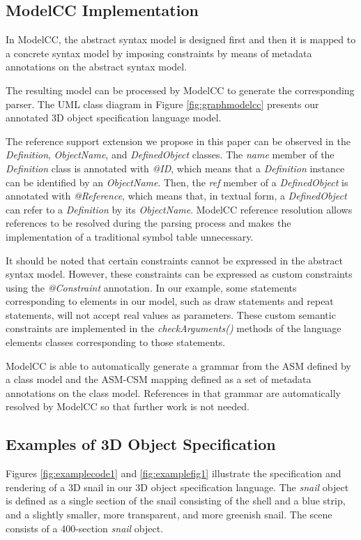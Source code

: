 \documentclass[floatfix,rmp,twocolumn,twoside]{revtex4}
\begin{document}
\subsection{ModelCC Implementation}

In ModelCC, the abstract syntax model is designed first and then it is mapped to a concrete syntax model by imposing constraints by means of metadata annotations on the abstract syntax model.

The resulting model can be processed by ModelCC to generate the corresponding parser.
The UML class diagram in Figure \ref{fig:graphmodelcc} presents our annotated 3D object specification language model.

The reference support extension we propose in this paper can be observed in the \emph{Definition}, \emph{ObjectName}, and \emph{DefinedObject} classes. The \emph{name} member of the \emph{Definition} class is annotated with \emph{@ID}, which means that a \emph{Definition} instance can be identified by an \emph{ObjectName}. Then, the \emph{ref} member of a \emph{DefinedObject} is annotated with \emph{@Reference}, which means that, in textual form, a \emph{DefinedObject} can refer to a \emph{Definition} by its \emph{ObjectName}. ModelCC reference resolution allows references to be resolved during the parsing process and makes the implementation of a traditional symbol table unnecessary.

It should be noted that certain constraints cannot be expressed in the abstract syntax model. However, these constraints can be expressed as custom constraints using the \emph{@Constraint} annotation. In our example, some statements corresponding to elements in our model, such as draw statements and repeat statements, will not accept real values as parameters. These custom semantic constraints are implemented in the \emph{checkArguments()} methods of the language elements classes corresponding to those statements.

ModelCC is able to automatically generate a grammar from the ASM defined by a class model and the ASM-CSM mapping defined as a set of metadata annotations on the class model. References in that grammar are automatically resolved by ModelCC so that further work is not needed.

\subsection{Examples of 3D Object Specification}

Figures \ref{fig:examplecode1} and \ref{fig:examplefig1} illustrate the specification and rendering of a 3D snail in our 3D object specification language. The \emph{snail} object is defined as a single section of the snail consisting of the shell and a blue strip, and a slightly smaller, more transparent, and more greenish snail. The scene consists of a 400-section \emph{snail} object.
\end{document}
